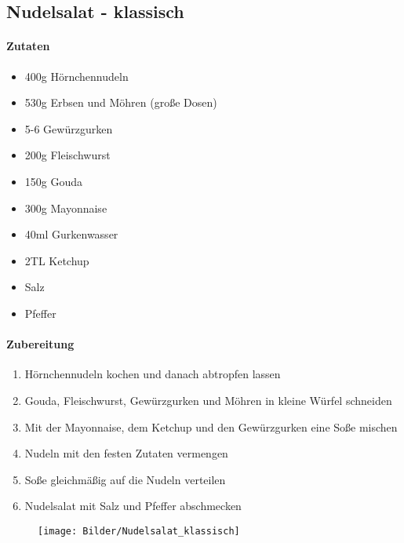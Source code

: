 \newpage
\subsection{Nudelsalat - klassisch}
\paragraph{Zutaten}
\begin{itemize}[noitemsep]
	\item 400g Hörnchennudeln
	\item 530g Erbsen und Möhren (große Dosen)
	\item 5-6 Gewürzgurken
	\item 200g Fleischwurst
	\item 150g Gouda
	\item 300g Mayonnaise
	\item 40ml Gurkenwasser
	\item 2TL Ketchup
	\item Salz
	\item Pfeffer
\end{itemize}
\paragraph{Zubereitung}
\begin{enumerate}[noitemsep]
	\item Hörnchennudeln kochen und danach abtropfen lassen
	\item Gouda, Fleischwurst, Gewürzgurken und Möhren in kleine Würfel schneiden
	\item Mit der Mayonnaise, dem Ketchup und den Gewürzgurken eine Soße mischen
	\item Nudeln mit den festen Zutaten vermengen
	\item Soße gleichmäßig auf die Nudeln verteilen
	\item Nudelsalat mit Salz und Pfeffer abschmecken
\end{enumerate}
\begin{figure}[h]
\centering
\texttt{[image: Bilder/Nudelsalat\_klassisch]}
\end{figure}
